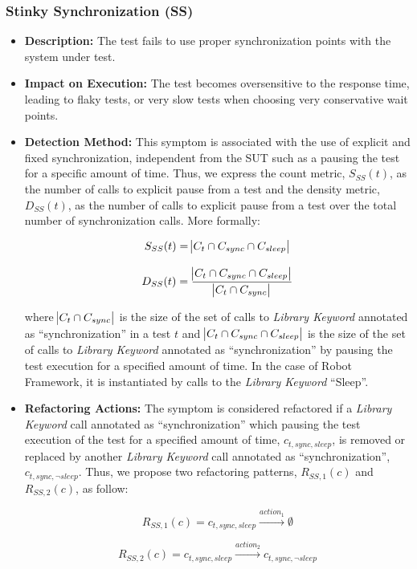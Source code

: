 \subsubsection{Stinky Synchronization (SS)}

\begin{itemize}
    \item \textbf{Description:} The test fails to use proper synchronization points with the system under test.

    \item \textbf{Impact on Execution:} The test becomes oversensitive to the response time, leading to flaky tests, or very slow tests when choosing very conservative wait points.
    
    \item \textbf{Detection Method:} This symptom is associated with the use of explicit and fixed synchronization, independent from the SUT such as a pausing the test for a specific amount of time. Thus, we express the count metric, $S_{SS}(t)$, as the number of calls to explicit pause from a test and the density metric, $D_{SS}(t)$, as the number of calls to explicit pause from a test over the total number of synchronization calls. More formally:
    
    \begin{equation*}
        S_{SS}(t) = \abs{C_{t} \cap C_{sync} \cap C_{sleep}}
    \end{equation*}
    
    \begin{equation*}
        D_{SS}(t) = \frac{\abs{C_{t} \cap C_{sync} \cap C_{sleep}}}{\abs{C_{t} \cap C_{sync}}}
    \end{equation*}
    
    where $\abs{C_{t} \cap C_{sync}}$ is the size of the set of calls to \emph{Library Keyword} annotated as ``synchronization'' in a test $t$ and $\abs{C_{t} \cap C_{sync} \cap C_{sleep}}$ is the size of the set of calls to \emph{Library Keyword} annotated as ``synchronization'' by pausing the test execution for a specified amount of time. In the case of Robot Framework, it is instantiated by calls to the \emph{Library Keyword} ``Sleep''.
    
    \item \textbf{Refactoring Actions:} The symptom is considered refactored if a \emph{Library Keyword} call annotated as ``synchronization'' which pausing the test execution of the test for a specified amount of time, $c_{t,sync,sleep}$, is removed or replaced by another \emph{Library Keyword} call annotated as ``synchronization'', $c_{t,sync, \neg sleep}$. Thus, we propose two refactoring patterns, $R_{SS, 1}(c)$ and $R_{SS, 2}(c)$, as follow:
    
    \begin{equation*}
        R_{SS, 1}(c) = c_{t,sync,sleep} \xrightarrow{action_1} \emptyset
    \end{equation*}
    
    \begin{equation*}
        R_{SS,2}(c) = c_{t,sync,sleep} \xrightarrow{action_2} c_{t,sync, \neg sleep}
    \end{equation*}
\end{itemize}

